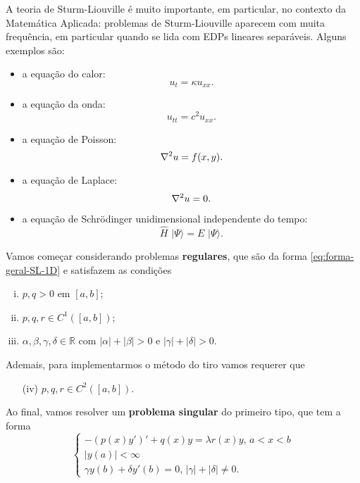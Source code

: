 \documentclass[twocolumn,showpacs,%
  nofootinbib,aps,superscriptaddress,%
  eqsecnum,prd,notitlepage,showkeys,10pt]{revtex4-1}
\newcommand{\R}{\mathbb{R}}
\begin{document}
A teoria de Sturm-Liouville é muito importante, em particular, no contexto
da Matemática Aplicada: problemas de Sturm-Liouville aparecem com muita
frequência, em particular quando se lida com EDPs lineares separáveis.
Alguns exemplos são:
%
\begin{itemize}
    \item a equação do calor:
    \[
        u_t = \kappa u_{xx}.
    \]
    \item a equação da onda:
    \[
        u_{tt} = c^2u_{xx}.
    \]
    \item a equação de Poisson:
    \[
        \laplacian u = f(x,y).
    \]
    \item a equação de Laplace:
    \[
        \laplacian u = 0.
    \]
    \item a equação de Schrödinger unidimensional independente do tempo:
    \[
        \hat{H} \phantom{i} |\Psi\rangle
        = E \phantom{i} |\Psi\rangle.
    \]
\end{itemize}
%
Vamos começar considerando problemas \textbf{regulares}, que são da forma
\eqref{eq:forma-geral-SL-1D} e satisfazem as condições
%
\begin{enumerate}[(i)]
    \item $p, q > 0$ em $[a,b]$;
    \item $p, q, r\in C^1([a,b])$;
    \item $\alpha, \beta, \gamma, \delta \in\R$ com $|\alpha| + |\beta| > 0$
    e $|\gamma| + |\delta| > 0$.
\end{enumerate}
%
Ademais, para implementarmos o método do tiro vamos requerer que
%
\begin{itemize}
    \item[(iv)] $p, q, r\in C^2([a,b])$.
\end{itemize}
%
Ao final, vamos resolver um \textbf{problema singular} do primeiro tipo, que tem
a forma
%
\begin{equation}
\label{eq:forma-geral-SL-1D-singular1}
    \left\{
    \begin{array}{l}
        -(p(x)y')' + q(x)y = \lambda r(x)y, \, a < x < b \\ 
        |y(a)| < \infty \\ 
        \gamma y(b) + \delta y'(b) = 0, \, |\gamma| + |\delta| \neq 0.
    \end{array}
    \right.
\end{equation}
\end{document}
